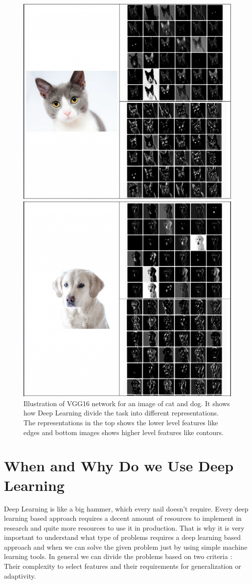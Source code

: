 \documentclass[a4paper]{article}
\begin{document}
\begin{figure}[H]
\centering
\begin{minipage}{.5\textwidth}
  \centering
  \includegraphics[width=0.4\linewidth]{images/cat.png}
\end{minipage}%

\begin{minipage}{.5\textwidth}
  \centering
  \includegraphics[width=.4\linewidth]{images/dog.png}
\end{minipage}

\caption{Illustration of VGG16 network for an image of cat and dog. It shows how Deep Learning divide the task into different representations. The representations in the top shows the lower level features like edges and bottom images shows higher level features like contours. 
}
\label{fig:1.1}
\end{figure}


\section{When and Why Do we Use Deep Learning}
Deep Learning is like a big hammer, which every nail doesn't require. Every deep learning based approach requires a decent amount of resources to implement in research and quite more resources to use it in production. That is why it is very important to understand what type of problems requires a deep learning based approach and when we can solve the given problem just by using simple machine learning tools. In general we can divide the problems based on two criteria : Their complexity to select features and their requirements for generalization or adaptivity. 
\end{document}
